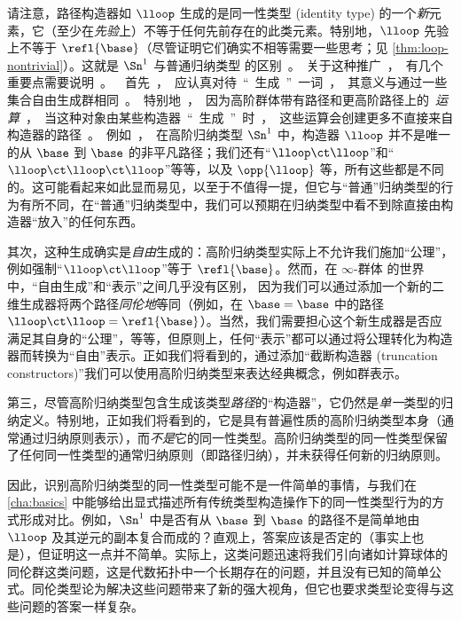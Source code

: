 请注意，路径构造器如 $\lloop$ 生成的是同一性类型 (identity type) 的一个\emph{新}元素，它（至少在\emph{先验}上）不等于任何先前存在的此类元素。特别地，$\lloop$ 先验上不等于 $\refl{\base}$（尽管证明它们确实不相等需要一些思考；见 \cref{thm:loop-nontrivial}）。这就是 $\Sn^1$ 与普通归纳类型 \unit 的区别。

关于这种推广，有几个重要点需要说明。

%
首先，应认真对待“生成”一词，其意义与通过一些集合自由生成群相同。特别地，因为高阶群体带有路径和更高阶路径上的\emph{运算}，当这种对象由某些构造器“生成”时，这些运算会创建更多不直接来自构造器的路径。例如，在高阶归纳类型 $\Sn^1$ 中，构造器 $\lloop$ 并不是唯一的从 $\base$ 到 $\base$ 的非平凡路径；我们还有“$\lloop\ct\lloop$”和“$\lloop\ct\lloop\ct\lloop$”等等，以及 $\opp{\lloop}$ 等，所有这些都是不同的。这可能看起来如此显而易见，以至于不值得一提，但它与“普通”归纳类型的行为有所不同，在“普通”归纳类型中，我们可以预期在归纳类型中看不到除直接由构造器“放入”的任何东西。

其次，这种生成确实是\emph{自由}生成的：高阶归纳类型实际上不允许我们施加“公理”，例如强制“$\lloop\ct\lloop$”等于 $\refl{\base}$。然而，在 $\infty$-群体%
的世界中，“自由生成”和“表示”之间几乎没有区别，
%
%
因为我们可以通过添加一个新的二维生成器将两个路径\emph{同伦地}等同（例如，在 $\base=\base$ 中的路径 $\lloop\ct\lloop = \refl{\base}$）。当然，我们需要担心这个新生成器是否应满足其自身的“公理”，等等，但原则上，任何“表示”都可以通过将公理转化为构造器而转换为“自由”表示。正如我们将看到的，通过添加“截断构造器 (truncation constructors)”我们可以使用高阶归纳类型来表达经典概念，例如群表示。

第三，尽管高阶归纳类型包含生成该类型\emph{路径}的“构造器”，它仍然是\emph{单一}类型的归纳定义。特别地，正如我们将看到的，它是具有普遍性质的高阶归纳类型本身（通常通过归纳原则表示），而\emph{不是}它的同一性类型。高阶归纳类型的同一性类型保留了任何同一性类型的通常归纳原则（即路径归纳），并未获得任何新的归纳原则。

因此，识别高阶归纳类型的同一性类型可能不是一件简单的事情，与我们在 \cref{cha:basics} 中能够给出显式描述所有传统类型构造操作下的同一性类型行为的方式形成对比。例如，$\Sn^1$ 中是否有从 $\base$ 到 $\base$ 的路径不是简单地由 $\lloop$ 及其逆元的副本复合而成的？直观上，答案应该是否定的（事实上也是），但证明这一点并不简单。实际上，这类问题迅速将我们引向诸如计算球体的同伦群这类问题，这是代数拓扑中一个长期存在的问题，并且没有已知的简单公式。同伦类型论为解决这些问题带来了新的强大视角，但它也要求类型论变得与这些问题的答案一样复杂。

